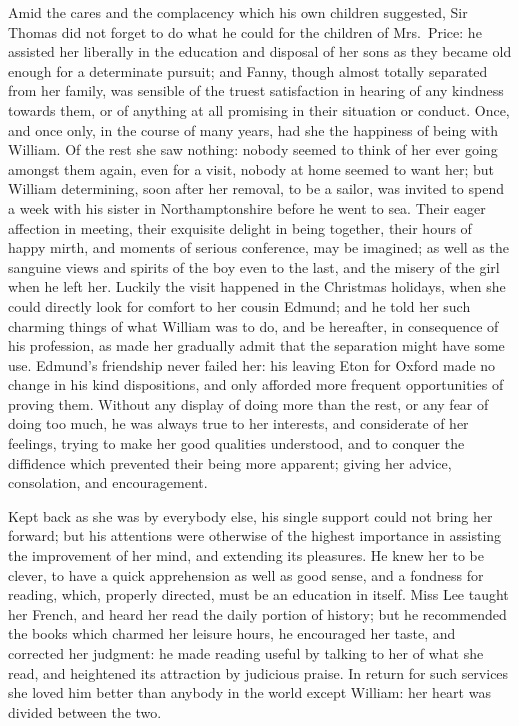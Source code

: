 Amid the cares and the complacency which his own
children suggested, Sir Thomas did not forget to do what
he could for the children of Mrs.\ Price:  he assisted
her liberally in the education and disposal of her sons
as they became old enough for a determinate pursuit;
and Fanny, though almost totally separated from her family,
was sensible of the truest satisfaction in hearing of any
kindness towards them, or of anything at all promising
in their situation or conduct.  Once, and once only,
in the course of many years, had she the happiness
of being with William.  Of the rest she saw nothing:
nobody seemed to think of her ever going amongst them again,
even for a visit, nobody at home seemed to want her;
but William determining, soon after her removal,
to be a sailor, was invited to spend a week with his
sister in Northamptonshire before he went to sea.
Their eager affection in meeting, their exquisite
delight in being together, their hours of happy mirth,
and moments of serious conference, may be imagined;
as well as the sanguine views and spirits of the boy even
to the last, and the misery of the girl when he left her.
Luckily the visit happened in the Christmas holidays,
when she could directly look for comfort to her cousin Edmund;
and he told her such charming things of what William was
to do, and be hereafter, in consequence of his profession,
as made her gradually admit that the separation might
have some use.  Edmund's friendship never failed her:
his leaving Eton for Oxford made no change in his kind
dispositions, and only afforded more frequent opportunities
of proving them.  Without any display of doing more than
the rest, or any fear of doing too much, he was always
true to her interests, and considerate of her feelings,
trying to make her good qualities understood, and to conquer
the diffidence which prevented their being more apparent;
giving her advice, consolation, and encouragement.

Kept back as she was by everybody else, his single support
could not bring her forward; but his attentions were otherwise
of the highest importance in assisting the improvement
of her mind, and extending its pleasures.  He knew her to
be clever, to have a quick apprehension as well as good sense,
and a fondness for reading, which, properly directed,
must be an education in itself.  Miss Lee taught her French,
and heard her read the daily portion of history; but he
recommended the books which charmed her leisure hours,
he encouraged her taste, and corrected her judgment:
he made reading useful by talking to her of what she read,
and heightened its attraction by judicious praise.
In return for such services she loved him better than
anybody in the world except William:  her heart was divided
between the two.



